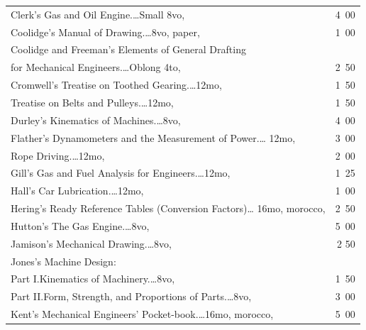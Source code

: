 \documentclass[a4paper,12pt]{book}[2004/02/16]
\theoremstyle{ilemma}
\theoremstyle{itheorem}
\theoremstyle{iother}
\theoremstyle{icorollary}
\theoremstyle{numcorollary}
\theoremstyle{idefinition}
\begin{document}
\begin{longtable}{@{}l@{ }r@{}}
Clerk's Gas and Oil Engine.\dotfill\ldots Small 8vo, &4\ 00\\

Coolidge's Manual of Drawing.\dotfill\ldots 8vo, paper, &1\ 00\\

Coolidge and Freeman's Elements of General Drafting\\

\indent\indent for Mechanical Engineers.\dotfill\ldots Oblong 4to, &2\ 50\\

Cromwell's Treatise on Toothed Gearing.\dotfill\ldots 12mo, &1\ 50\\

\indent Treatise on Belts and Pulleys.\dotfill\ldots 12mo, &1\ 50\\

Durley's Kinematics of Machines.\dotfill\ldots 8vo, &4\ 00\\

Flather's Dynamometers and the Measurement of Power.\dotfill\ldots
12mo, &3\ 00\\

\indent Rope Driving.\dotfill\ldots 12mo, &2\ 00\\

Gill's Gas and Fuel Analysis for Engineers.\dotfill\ldots 12mo, &1\ 25\\

Hall's Car Lubrication.\dotfill\ldots 12mo, &1\ 00\\

Hering's Ready Reference Tables (Conversion Factors)\dotfill\ldots
16mo, morocco, &2\ 50\\

Hutton's The Gas Engine.\dotfill\ldots 8vo, &5\ 00\\

Jamison's Mechanical Drawing.\dotfill\ldots 8vo, &2 50\\

Jones's Machine Design:\\

\indent Part I.\quad Kinematics of Machinery.\dotfill\ldots 8vo, &1\
50\\

\indent Part II.\quad Form, Strength, and Proportions of
Parts.\dotfill\ldots 8vo, &3\ 00\\

Kent's Mechanical Engineers' Pocket-book.\dotfill\ldots 16mo, morocco,
&5\ 00\\


\end{longtable}
\end{document}
